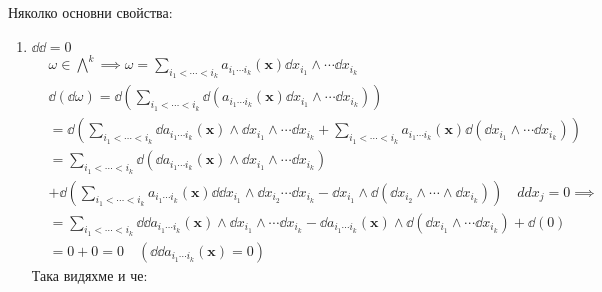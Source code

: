 \documentclass[12pt]{article}
\begin{document}
\begin{large}
Няколко основни свойства:
\begin{enumerate}
\begin{comment}
\item $\dd (\omega_1+\omega_2)=\dd \omega_1 + \dd \omega_2$
По индукция:
\begin{align*}
&\omega_1,\omega_2 \in {\bigwedge}^0: \quad  \omega_1=f, \enspace \omega_2=g,
\dd (\omega_1+\omega_2)=\dd (f+g)=\dd f + \dd g = \dd \omega_1 + \dd \omega_2 \\
&\omega_1, \omega_2 \in {\bigwedge}^k: \quad d(\omega_1+\omega_2)=\dd(\sum_{i_1<\cdots<i_k}a_{i_1 \cdots i_k}(\mathbf{x}) \dd x_{i_1} \wedge \cdots \dd x_{i_k}+\sum_{i_1<\cdots<i_k}b_{i_1 \cdots i_k}(\mathbf{x}) \dd x_{i_1} \wedge \cdots \dd x_{i_k}) \\
&=\dd (\sum_{i_1<\cdots<i_k}(a_{i_1 \cdots i_k}(\mathbf{x})+b_{i_1 \cdots i_k}(\mathbf{x})) \dd x_{i_1} \wedge \cdots \dd x_{i_k}) \\
&=
\end{align*}
\end{comment}
  \item $\dd \dd = 0$
  \begin{align*}
    &\omega \in {\bigwedge}^k \implies \omega = \sum_{i_1<\cdots<i_k}a_{i_1 \cdots i_k}(\mathbf{x}) \dd x_{i_1} \wedge \cdots \dd x_{i_k} \\
    &\dd (\dd \omega) = \dd(\sum_{i_1<\cdots<i_k}\dd(a_{i_1 \cdots i_k}(\mathbf{x}) \dd x_{i_1} \wedge \cdots \dd x_{i_k})) \\
    &= \dd (\sum_{i_1<\cdots<i_k} \dd a_{i_1 \cdots i_k}(\mathbf{x}) \wedge \dd x_{i_1} \wedge \cdots \dd x_{i_k} + \sum_{i_1<\cdots<i_k} a_{i_1 \cdots i_k}(\mathbf{x}) \dd(\dd x_{i_1} \wedge \cdots \dd x_{i_k})) \\
    &=\sum_{i_1<\cdots<i_k}\dd(\dd a_{i_1 \cdots i_k}(\mathbf{x}) \wedge \dd x_{i_1} \wedge \cdots \dd x_{i_k}) \\
    &+\dd (\sum_{i_1<\cdots<i_k} a_{i_1 \cdots i_k}(\mathbf{x}) \dd \dd x_{i_1} \wedge \dd x_{i_2} \cdots \dd x_{i_k}-\dd x_{i_1} \wedge \dd( \dd x_{i_2} \wedge \cdots \wedge \dd x_{i_k})) \quad ddx_j=0 \implies \\
    &=\sum_{i_1<\cdots<i_k} \dd \dd a_{i_1 \cdots i_k}(\mathbf{x}) \wedge \dd x_{i_1} \wedge \cdots \dd x_{i_k} - \dd a_{i_1 \cdots i_k}(\mathbf{x}) \wedge \dd(\dd x_{i_1} \wedge \cdots \dd x_{i_k}) + \dd(0) \\
    &=0 + 0 = 0 \quad (\dd \dd a_{i_1 \cdots i_k}(\mathbf{x})=0)
  \end{align*}
  Така видяхме и че:

\end{enumerate}
\end{large}
\end{document}
